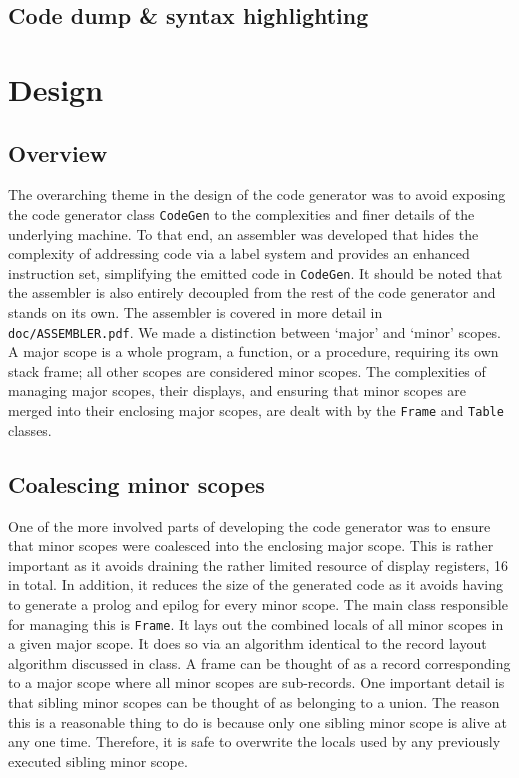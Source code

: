 \documentclass[oneside]{amsart}
\theoremstyle{definition}
\theoremstyle{remark}
\numberwithin{equation}{section}
\begin{document}
\subsection{Code dump \& syntax highlighting}

\section{Design}
\subsection{Overview}
The overarching theme in the design of the code generator was to avoid exposing the code generator
class \texttt{CodeGen} to the complexities and finer details of the underlying machine. To that end,
an assembler was developed that hides the complexity of addressing code via a label system and
provides an enhanced instruction set, simplifying the emitted code in \texttt{CodeGen}. It should be
noted that the assembler is also entirely decoupled from the rest of the code generator and stands
on its own. The assembler is covered in more detail in \texttt{doc/ASSEMBLER.pdf}. We made a
distinction  between `major' and `minor' scopes. A major scope is a whole program, a function, or a
procedure, requiring its own stack frame; all other scopes are considered minor scopes. The
complexities of  managing major scopes, their displays, and ensuring that minor scopes are merged
into their enclosing  major scopes, are dealt with by the \texttt{Frame} and \texttt{Table} classes.

\subsection{Coalescing minor scopes}
One of the more involved parts of developing the code generator was to ensure that minor scopes were
coalesced into the enclosing major scope. This is rather important as it avoids draining the rather
limited resource of display registers, 16 in total. In addition, it reduces the size of the
generated code as it avoids having to generate a prolog and epilog for every minor scope. The main
class responsible for managing this is \texttt{Frame}. It lays out the combined locals of all minor
scopes in a given major scope. It does so via an algorithm identical to the record layout algorithm
discussed in class. A frame can be thought of as a record corresponding to a major scope where all
minor scopes are sub-records. One important detail is that sibling minor scopes can be thought of as
belonging to a union. The reason this is a reasonable thing to do is because only one sibling minor
scope is alive at any one time. Therefore, it is safe to overwrite the locals used by any previously
executed sibling minor scope.
\end{document}
